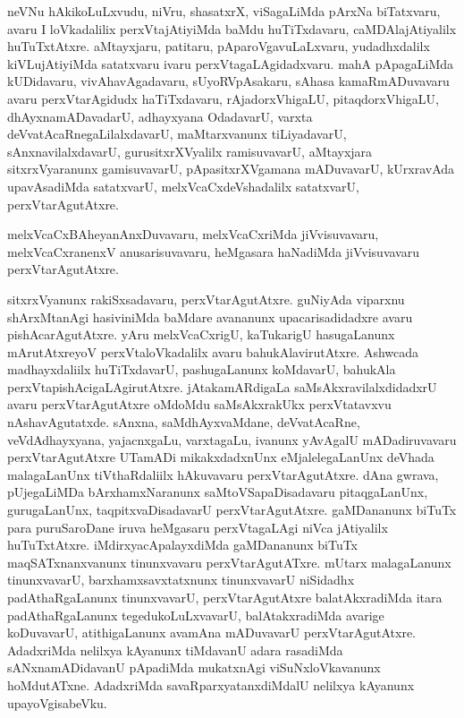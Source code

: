 \documentclass{article}
\begin{document}
\begin{mng}%
neVNu hAkikoLuLxvudu, niVru, shasatxrX, viSagaLiMda pArxNa biTatxvaru, 
avaru I loVkadalilix perxVtajAtiyiMda baMdu huTiTxdavaru, 
caMDAlajAtiyalilx huTuTxtAtxre. aMtayxjaru, patitaru, 
pAparoVgavuLaLxvaru, yudadhxdalilx kiVLujAtiyiMda satatxvaru ivaru 
perxVtagaLAgidadxvaru. mahA pApagaLiMda kUDidavaru, vivAhavAgadavaru, 
sUyoRVpAsakaru, sAhasa kamaRmADuvavaru avaru perxVtarAgidudx 
haTiTxdavaru, rAjadorxVhigaLU, pitaqdorxVhigaLU, dhAyxnamADavadarU, 
adhayxyana OdadavarU, varxta deVvatAcaRnegaLilalxdavarU, maMtarxvanunx 
tiLiyadavarU, sAnxnavilalxdavarU, gurusitxrXVyalilx ramisuvavarU, 
aMtayxjara sitxrxVyaranunx gamisuvavarU, pApasitxrXVgamana mADuvavarU, 
kUrxravAda upavAsadiMda satatxvarU, melxVcaCxdeVshadalilx satatxvarU, 
perxVtarAgutAtxre.
\end{mng}

\begin{mng}%
melxVcaCxBAheyanAnxDuvavaru, melxVcaCxriMda jiVvisuvavaru, 
melxVcaCxranenxV anusarisuvavaru, heMgasara haNadiMda jiVvisuvavaru 
perxVtarAgutAtxre.
\end{mng}

\begin{mng}%
sitxrxVyanunx rakiSxsadavaru, perxVtarAgutAtxre. guNiyAda viparxnu 
shArxMtanAgi hasiviniMda baMdare avananunx upacarisadidadxre avaru 
pishAcarAgutAtxre. yAru melxVcaCxrigU, kaTukarigU hasugaLanunx 
mArutAtxreyoV perxVtaloVkadalilx avaru bahukAlavirutAtxre. Ashwcada 
madhayxdaliilx huTiTxdavarU, pashugaLanunx koMdavarU, bahukAla 
perxVtapishAcigaLAgirutAtxre. jAtakamARdigaLa saMsAkxravilalxdidadxrU 
avaru perxVtarAgutAtxre oMdoMdu saMsAkxrakUkx perxVtatavxvu 
nAshavAgutatxde. sAnxna, saMdhAyxvaMdane, deVvatAcaRne, 
veVdAdhayxyana, yajacnxgaLu, varxtagaLu, ivanunx yAvAgalU 
mADadiruvavaru perxVtarAgutAtxre UTamADi mikakxdadxnUnx 
eMjalelegaLanUnx deVhada malagaLanUnx tiVthaRdaliilx hAkuvavaru 
perxVtarAgutAtxre. dAna gwrava, pUjegaLiMDa bArxhamxNaranunx 
saMtoVSapaDisadavaru pitaqgaLanUnx, gurugaLanUnx, taqpitxvaDisadavarU 
perxVtarAgutAtxre. gaMDananunx biTuTx para puruSaroDane iruva 
heMgasaru perxVtagaLAgi niVca jAtiyalilx huTuTxtAtxre. 
iMdirxyacApalayxdiMda gaMDananunx biTuTx maqSATxnanxvanunx 
tinunxvavaru perxVtarAgutATxre. mUtarx malagaLanunx tinunxvavarU, 
barxhamxsavxtatxnunx tinunxvavarU niSidadhx padAthaRgaLanunx 
tinunxvavarU, perxVtarAgutAtxre balatAkxradiMda itara padAthaRgaLanunx 
tegedukoLuLxvavarU, balAtakxradiMda avarige koDuvavarU, atithigaLanunx 
avamAna mADuvavarU perxVtarAgutAtxre. AdadxriMda nelilxya kAyanunx 
tiMdavanU adara rasadiMda sANxnamADidavanU pApadiMda mukatxnAgi 
viSuNxloVkavanunx hoMdutATxne. AdadxriMda savaRparxyatanxdiMdalU 
nelilxya kAyanunx upayoVgisabeVku.
\end{mng}
\end{document}
